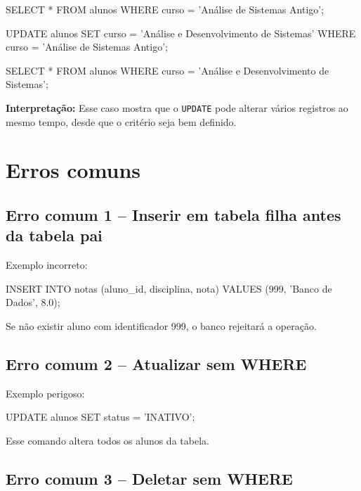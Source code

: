 \begin{sqlcode}
SELECT *
FROM alunos
WHERE curso = 'Análise de Sistemas Antigo';
\end{sqlcode}

\begin{sqlcode}
UPDATE alunos
SET curso = 'Análise e Desenvolvimento de Sistemas'
WHERE curso = 'Análise de Sistemas Antigo';
\end{sqlcode}

\begin{sqlcode}
SELECT *
FROM alunos
WHERE curso = 'Análise e Desenvolvimento de Sistemas';
\end{sqlcode}

\textbf{Interpretação:}  
Esse caso mostra que o \texttt{UPDATE} pode alterar vários registros ao mesmo tempo, desde que o critério seja bem definido.

\section{Erros comuns}

\subsection{Erro comum 1 -- Inserir em tabela filha antes da tabela pai}

Exemplo incorreto:

\begin{sqlcode}
INSERT INTO notas (aluno_id, disciplina, nota)
VALUES (999, 'Banco de Dados', 8.0);
\end{sqlcode}

Se não existir aluno com identificador 999, o banco rejeitará a operação.

\subsection{Erro comum 2 -- Atualizar sem WHERE}

Exemplo perigoso:

\begin{sqlcode}
UPDATE alunos
SET status = 'INATIVO';
\end{sqlcode}

Esse comando altera todos os alunos da tabela.

\subsection{Erro comum 3 -- Deletar sem WHERE}

